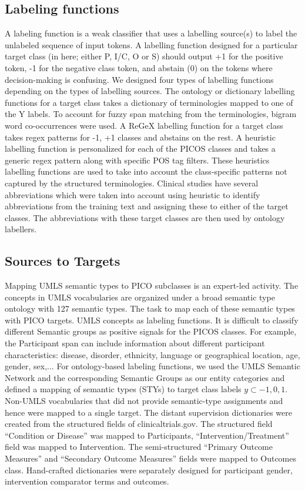 \documentclass[10.7pt,]{article}
\begin{document}
\subsection{Labeling functions}\label{lfs}
%
A labeling function is a weak classifier that uses a labelling source(s) to label the unlabeled sequence of input tokens.
A labelling function designed for a particular target class (in here; either P, I/C, O or S) should output +1 for the positive token, -1 for the negative class token, and abstain (0) on the tokens where decision-making is confusing.
We designed four types of labelling functions depending on the types of labelling sources.
The ontology or dictionary labelling functions for a target class takes a dictionary of terminologies mapped to one of the Y labels.
To account for fuzzy span matching from the terminologies, bigram word co-occurrences were used.
A ReGeX labelling function for a target class takes regex patterns for -1, +1 classes and abstains on the rest.
A heuristic labelling function is personalized for each of the PICOS classes and takes a generic regex pattern along with specific POS tag filters.
These heuristics labelling functions are used to take into account the class-specific patterns not captured by the structured terminologies.
Clinical studies have several abbreviations which were taken into account using heuristic to identify abbreviations from the training text and assigning these to either of the target classes. 
The abbreviations with these target classes are then used by ontology labellers.
%
%
%
\subsection{Sources to Targets}\label{lfs}
%
Mapping UMLS semantic types to PICO subclasses is an expert-led activity.
The concepts in UMLS vocabularies are organized under a broad semantic type ontology with 127 semantic types.
The task to map each of these semantic types with PICO targets.
UMLS concepts as labeling functions. It is difficult to classify different Semantic groups as positive signals for the PICOS classes. For example, the Participant span can include information about different participant characteristics: disease, disorder, ethnicity, language or geographical location, age, gender, sex,...
For ontology-based labeling functions, we used the UMLS Semantic Network and the corresponding Semantic Groups as our entity categories and defined a mapping of semantic types (STYs) to target class labels $y \subset {-1,0,1}$.
Non-UMLS vocabularies that did not provide semantic-type assignments and hence were mapped to a single target.
The distant supervision dictionaries were created from the structured fields of clinicaltrials.gov. 
The structured field ``Condition or Disease'' was mapped to Participants, ``Intervention/Treatment'' field was mapped to Intervention.
The semi-structured ``Primary Outcome Measures'' and ``Secondary Outcome Measures'' fields were mapped to Outcomes class.
Hand-crafted dictionaries were separately designed for participant gender, intervention comparator terms and outcomes.
%
%
%
\end{document}
